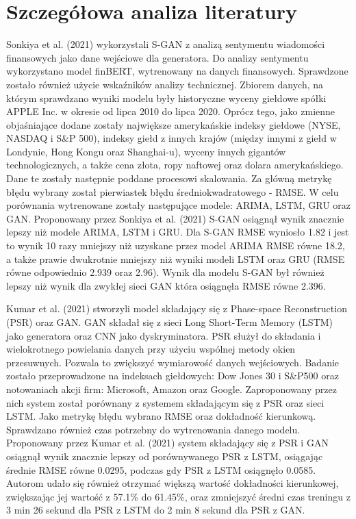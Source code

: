 \documentclass[11pt]{article} %
\begin{document}
\section{Szczegółowa analiza literatury}
Sonkiya et al. (2021) wykorzystali S-GAN z analizą sentymentu wiadomości finansowych jako dane wejściowe dla generatora. Do analizy sentymentu wykorzystano model finBERT, wytrenowany na danych finansowych. Sprawdzone zostało również użycie wskaźników analizy technicznej. Zbiorem danych, na którym sprawdzano wyniki modelu były historyczne wyceny giełdowe spółki APPLE Inc. w okresie od lipca 2010 do lipca 2020. Oprócz tego, jako zmienne objaśniające dodane zostały największe amerykańskie indeksy giełdowe (NYSE, NASDAQ i S\&P 500), indeksy giełd z innych krajów (między innymi z giełd w Londynie, Hong Kongu oraz Shanghai-u), wyceny innych gigantów technologicznych, a także cena złota, ropy naftowej oraz dolara amerykańskiego. Dane te zostały następnie poddane procesowi skalowania. Za główną metrykę błędu wybrany został pierwiastek błędu średniokwadratowego - RMSE. W celu porównania wytrenowane zostały następujące modele: ARIMA, LSTM, GRU oraz GAN. Proponowany przez Sonkiya et al. (2021) S-GAN osiągnął wynik znacznie lepszy niż modele ARIMA, LSTM i GRU. Dla S-GAN RMSE wyniosło 1.82 i jest to wynik 10 razy mniejszy niż uzyskane przez model ARIMA RMSE równe 18.2, a także prawie dwukrotnie mniejszy niż wyniki modeli LSTM oraz GRU (RMSE równe odpowiednio 2.939 oraz 2.96). Wynik dla modelu S-GAN był również lepszy niż wynik dla zwykłej sieci GAN która osiągnęła RMSE równe 2.396. 

 Kumar et al. (2021) stworzyli model składający się z Phase-space Reconstruction (PSR) oraz GAN. GAN składał się z sieci Long Short-Term Memory (LSTM) jako generatora oraz CNN jako dyskryminatora. PSR służył do składania i wielokrotnego powielania danych przy użyciu wspólnej metody okien przesuwnych. Pozwala to zwiększyć wymiarowość danych wejściowych. Badanie zostało przeprowadzone na indeksach giełdowych: Dow Jones 30 i S\&P500 oraz notowaniach akcji firm: Microsoft, Amazon oraz Google. Zaproponowany przez nich system został porównany z systemem składającym się z PSR oraz sieci LSTM. Jako metrykę błędu wybrano RMSE oraz dokładność kierunkową. Sprawdzano również czas potrzebny do wytrenowania danego modelu. Proponowany przez Kumar et al. (2021) system składający się z PSR i GAN osiągnął wynik znacznie lepszy od porównywanego PSR z LSTM, osiągając średnie RMSE równe 0.0295, podczas gdy PSR z LSTM osiągnęło 0.0585. Autorom udało się również otrzymać większą wartość dokładności kierunkowej, zwiększając jej wartość z 57.1\% do 61.45\%, oraz zmniejszyć średni czas treningu z 3 min 26 sekund dla PSR z LSTM do 2 min 8 sekund dla PSR z GAN.
\end{document}
